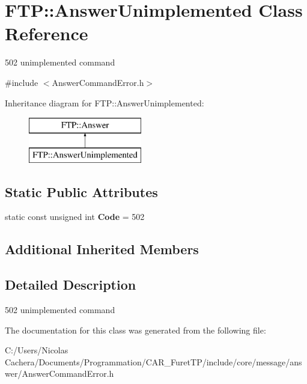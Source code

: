\hypertarget{classFTP_1_1AnswerUnimplemented}{}\section{F\+T\+P\+:\+:Answer\+Unimplemented Class Reference}
\label{classFTP_1_1AnswerUnimplemented}


502 unimplemented command  




{\ttfamily \#include $<$Answer\+Command\+Error.\+h$>$}

Inheritance diagram for F\+T\+P\+:\+:Answer\+Unimplemented\+:\begin{figure}[H]
\begin{center}
\leavevmode
\includegraphics[height=2.000000cm]{classFTP_1_1AnswerUnimplemented}
\end{center}
\end{figure}
\subsection*{Static Public Attributes}
\begin{DoxyCompactItemize}
\item 
\hypertarget{classFTP_1_1AnswerUnimplemented_a2cd23d0c7ad3f6c5b353012a27cc1fcd}{}static const unsigned int {\bfseries Code} = 502\label{classFTP_1_1AnswerUnimplemented_a2cd23d0c7ad3f6c5b353012a27cc1fcd}

\end{DoxyCompactItemize}
\subsection*{Additional Inherited Members}


\subsection{Detailed Description}
502 unimplemented command 

The documentation for this class was generated from the following file\+:\begin{DoxyCompactItemize}
\item 
C\+:/\+Users/\+Nicolas Cachera/\+Documents/\+Programmation/\+C\+A\+R\+\_\+\+Furet\+T\+P/include/core/message/answer/Answer\+Command\+Error.\+h\end{DoxyCompactItemize}
